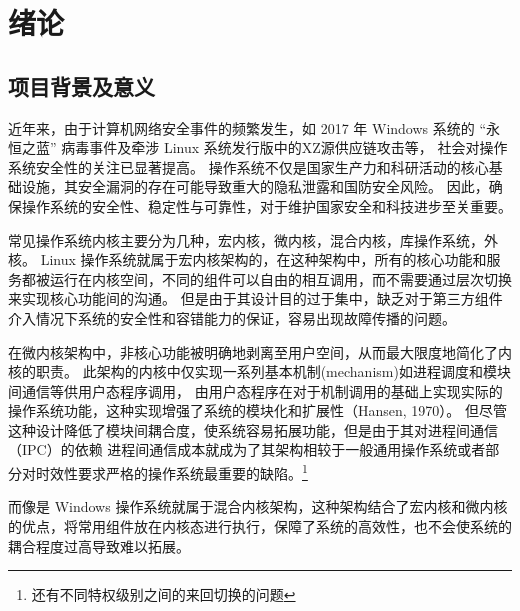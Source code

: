 \section{绪论}

\subsection{项目背景及意义}


    近年来，由于计算机网络安全事件的频繁发生，如 2017 年 Windows 系统的 “永恒之蓝” 病毒事件及牵涉 Linux 系统发行版中的XZ源供应链攻击等，
    社会对操作系统安全性的关注已显著提高。
    操作系统不仅是国家生产力和科研活动的核心基础设施，其安全漏洞的存在可能导致重大的隐私泄露和国防安全风险。
    因此，确保操作系统的安全性、稳定性与可靠性，对于维护国家安全和科技进步至关重要。


    常见操作系统内核主要分为几种，宏内核，微内核，混合内核，库操作系统，外核。
    Linux 操作系统就属于宏内核架构的，在这种架构中，所有的核心功能和服务都被运行在内核空间，不同的组件可以自由的相互调用，而不需要通过层次切换来实现核心功能间的沟通。
    但是由于其设计目的过于集中，缺乏对于第三方组件介入情况下系统的安全性和容错能力的保证，容易出现故障传播的问题。
    \cite{singh_microkernel_nodate}


    在微内核架构中，非核心功能被明确地剥离至用户空间，从而最大限度地简化了内核的职责。
    此架构的内核中仅实现一系列基本机制(mechanism)如进程调度和模块间通信等供用户态程序调用，
    由用户态程序在对于机制调用的基础上实现实际的操作系统功能，这种实现增强了系统的模块化和扩展性（Hansen, 1970）。
    但尽管这种设计降低了模块间耦合度，使系统容易拓展功能，但是由于其对进程间通信（IPC）的依赖
    进程间通信成本就成为了其架构相较于一般通用操作系统或者部分对时效性要求严格的操作系统最重要的缺陷。\footnote{还有不同特权级别之间的来回切换的问题}
    \cite{hansen_nucleus_1970}

    而像是 Windows 操作系统就属于混合内核架构，这种架构结合了宏内核和微内核的优点，将常用组件放在内核态进行执行，保障了系统的高效性，也不会使系统的耦合程度过高导致难以拓展。

